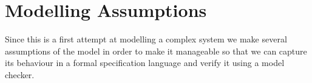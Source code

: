 \begin{comment}



\def\r{3} 
\def\sone{ \sin 32}
\def\stwo{\sin 72}
\def\cone{\cos 32}
\def\ctwo{\cos 72}
\coordinate(top) at (0,\r);
\coordinate(topleft) at ({ \r * -cos (36)},{ \r * -sin (36)});
\coordinate(topright) at ({ \r * cos (72)}, { \r * -sin (72)});
\coordinate(botleft) at ({ \r * - cos (36)},{ \r * sin (36)});
\coordinate(botright) at ({\r * sin (72)},{\r * cos (72)});

\tikzstyle{box1}=[circle, draw, text width = 2cm, font=\scriptsize]
\tikzstyle{box3}=[rectangle, draw, text width = 2cm, font=\scriptsize]
\tikzstyle{arrow}=[->, thick]
\tikzstyle{biarrow}=[<->,very thick,shorten >=7pt,shorten <=7pt]


\node (A) [font = \scriptsize]  at (topleft)                  {D =150 };

\node (B) [font = \scriptsize]    at (botleft)          {D = 0};

\node (C)[font = \scriptsize] at (top)  { D = 100
						};

\node (D)[font = \scriptsize] at (botright)  { D = 50
						};

\node (E) [font = \scriptsize] at (topright) {D = 200};

\draw [arrow] (D) -- node[right] {$t_1$} (E);
\draw [arrow] (A) -- node[below = 10pt] {$t_4$} (B);
\draw [arrow] (B) --  node[above = 10pt] {$t_2$} (C);
\draw [arrow] (C) -- node [left] {$t_3$} (D);
\end{comment}


\section{Modelling Assumptions}
Since this is a first attempt at modelling a complex system we make several assumptions of the model in order to make it manageable so that we can capture its behaviour in a formal specification language and verify it using a model checker.

